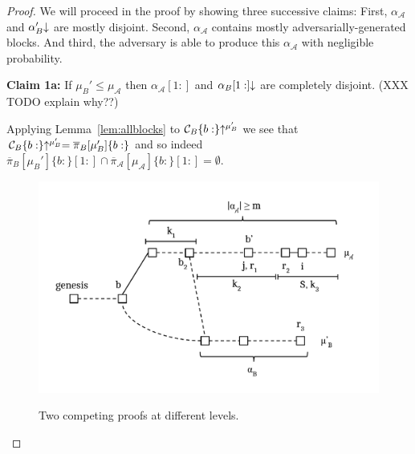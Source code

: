\begin{proof}
%

%

    We will proceed in the proof by showing three successive claims: First,
    $\alpha_\mathcal{A}$ and $\alpha'_B\negthickspace\downarrow$ are mostly
    disjoint. Second, $\alpha_\mathcal{A}$ contains mostly
    adversarially-generated blocks. And third, the adversary is able to produce
    this $\alpha_\mathcal{A}$ with negligible probability.

    \textbf{Claim 1a: } If $\mu_B' \leq \mu_\mathcal{A}$ then
    $\alpha_\mathcal{A}[1:]$ and $\alpha_B[1:]\negthickspace\downarrow$ are completely
    disjoint. (XXX TODO explain why??)

    Applying Lemma~\ref{lem:allblocks}
    to $\mathcal{C}_B\{b:\}\negthickspace\uparrow^{\mu_B'}$ we see that
    $\mathcal{C}_B\{b:\}\negthickspace\uparrow^{\mu_B'} = \overline\pi_B[\mu_B']\{b:\}$ and so
    indeed
    $\overline\pi_B[\mu_B']\{b:\}[1:] \cap
    \overline\pi_\mathcal{A}[\mu_\mathcal{A}]\{b:\}[1:] = \emptyset$.

    \begin{figure}
        \caption{Two competing proofs at different levels.}
        \centering
        \includegraphics[width=\columnwidth,keepaspectratio]{figures/security-proof-chain.pdf}
        \label{fig.sec-comparison}
    \end{figure}


\end{proof}
